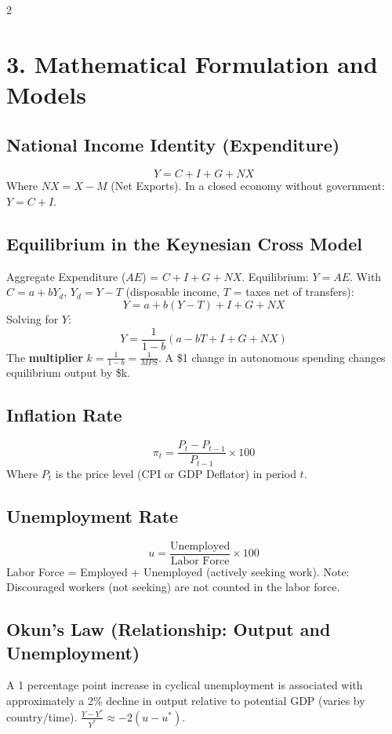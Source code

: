 \documentclass[10pt,a4paper]{article}
\begin{document}
\begin{multicols}{2}
\section*{3. Mathematical Formulation and Models}

\subsection*{National Income Identity (Expenditure)}
\[
Y = C + I + G + NX
\]
Where $NX = X - M$ (Net Exports). In a closed economy without government: $Y = C + I$.

\subsection*{Equilibrium in the Keynesian Cross Model}
Aggregate Expenditure ($AE$) = $C + I + G + NX$. Equilibrium: $Y = AE$.
With $C = a + bY_d$, $Y_d = Y - T$ (disposable income, $T$ = taxes net of transfers):
\[
Y = a + b(Y - T) + I + G + NX
\]
Solving for $Y$:
\[
Y = \frac{1}{1-b} \left( a - bT + I + G + NX \right)
\]
The \textbf{multiplier} $k = \frac{1}{1-b} = \frac{1}{MPS}$. A \$1 change in autonomous spending changes equilibrium output by \$k.

\subsection*{Inflation Rate}
\[
\pi_t = \frac{P_t - P_{t-1}}{P_{t-1}} \times 100
\]
Where $P_t$ is the price level (CPI or GDP Deflator) in period $t$.

\subsection*{Unemployment Rate}
\[
u = \frac{\text{Unemployed}}{\text{Labor Force}} \times 100
\]
Labor Force = Employed + Unemployed (actively seeking work). Note: Discouraged workers (not seeking) are not counted in the labor force.

\subsection*{Okun's Law (Relationship: Output and Unemployment)}
A 1 percentage point increase in cyclical unemployment is associated with approximately a 2\% decline in output relative to potential GDP (varies by country/time). $\frac{Y - Y^*}{Y^*} \approx -2 (u - u^*)$.


\end{multicols}
\end{document}
